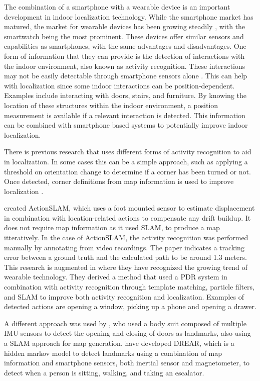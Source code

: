 The combination of a smartphone with a wearable device is an important development in indoor localization technology. While the smartphone market has matured, the market for wearable devices has been growing steadily \cite{jung2016consumer}, with the smartwatch being the most prominent. These devices offer similar sensors and capabilities as smartphones, with the same advantages and disadvantages. One form of information that they can provide is the detection of interactions with the indoor environment, also known as activity recognition. These interactions may not be easily detectable through smartphone sensors alone \cite{Shoaib2015}. This can help with localization since some indoor interactions can be position-dependent. Examples include interacting with doors, stairs, and furniture. By knowing the location of these structures within the indoor environment, a position measurement is available if a relevant interaction is detected. This information can be combined with smartphone based systems to potentially improve indoor localization.

There is previous research that uses different forms of activity recognition to aid in localization. In some cases this can be a simple approach, such as applying a threshold on orientation change to determine if a corner has been turned or not. Once detected, corner definitions from map information is used to improve localization \cite{Gu2019,Jackermeier2018}. \par 
\citet{Hardegger2012} created ActionSLAM, which uses a foot mounted sensor to estimate displacement in combination with location-related actions to compensate any drift buildup. It does not require map information as it used \ac{SLAM}, to produce a map itteratively. In the case of ActionSLAM, the activity recognition was performed manually by annotating from video recordings. The paper indicates a tracking error between a ground truth and the calculated path to be around 1.3 meters. This research is augmented in \citet{Hardegger2016} where they have recognized the growing trend of wearable technology. They derived a method that used a \ac{PDR} system in combination with activity recognition through template matching, particle filters, and SLAM to improve both activity recognition and localization. Examples of detected actions are opening a window, picking up a phone and opening a drawer. \par
A different approach was used by \citet{Grzonka2010}, who used a body suit composed of multiple IMU sensors to detect the opening and closing of doors as landmarks, also using a \ac{SLAM} approach for map generation. \citet{Torok2014} have developed DREAR, which is a hidden markov model to detect landmarks using a combination of map information and smartphone sensors, both inertial sensor and magnetometer, to detect when a person is sitting, walking, and taking an escalator.

